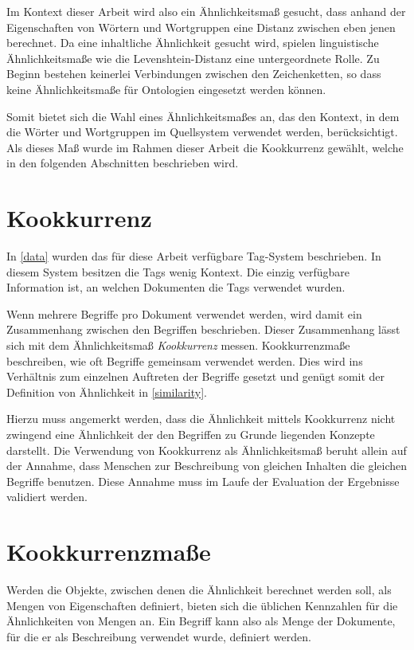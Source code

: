 Im Kontext dieser Arbeit wird also ein Ähnlichkeitsmaß gesucht, dass anhand der Eigenschaften von Wörtern und Wortgruppen eine Distanz zwischen eben jenen berechnet. Da eine inhaltliche Ähnlichkeit gesucht wird, spielen linguistische Ähnlichkeitsmaße wie die Levenshtein-Distanz eine untergeordnete Rolle. Zu Beginn bestehen keinerlei Verbindungen zwischen den Zeichenketten, so dass keine Ähnlichkeitsmaße für Ontologien eingesetzt werden können.

Somit bietet sich die Wahl eines Ähnlichkeitsmaßes an, das den Kontext, in dem die Wörter und Wortgruppen im Quellsystem verwendet werden, berücksichtigt. Als dieses Maß wurde im Rahmen dieser Arbeit die Kookkurrenz gewählt, welche in den folgenden Abschnitten beschrieben wird.

\section{Kookkurrenz}

In \ref{data} wurden das für diese Arbeit verfügbare Tag-System beschrieben. In diesem System besitzen die Tags wenig Kontext. Die einzig verfügbare Information ist, an welchen Dokumenten die Tags verwendet wurden.

Wenn mehrere Begriffe pro Dokument verwendet werden, wird damit ein Zusammenhang zwischen den Begriffen beschrieben. Dieser Zusammenhang lässt sich mit dem Ähnlichkeitsmaß \emph{Kookkurrenz} messen. Kookkurrenzmaße beschreiben, wie oft Begriffe gemeinsam verwendet werden. Dies wird ins Verhältnis zum einzelnen Auftreten der Begriffe gesetzt und genügt somit der Definition von Ähnlichkeit in \ref{similarity}.

Hierzu muss angemerkt werden, dass die Ähnlichkeit mittels Kookkurrenz nicht zwingend eine Ähnlichkeit der den Begriffen zu Grunde liegenden Konzepte darstellt. Die Verwendung von Kookkurrenz als Ähnlichkeitsmaß beruht allein auf der Annahme, dass Menschen zur Beschreibung von gleichen Inhalten die gleichen Begriffe benutzen. Diese Annahme muss im Laufe der Evaluation der Ergebnisse validiert werden.

\section{Kookkurrenzmaße}
\label{measures}

Werden die Objekte, zwischen denen die Ähnlichkeit berechnet werden soll, als Mengen von Eigenschaften definiert, bieten sich die üblichen Kennzahlen für die Ähnlichkeiten von Mengen an. Ein Begriff kann also als Menge der Dokumente, für die er als Beschreibung verwendet wurde, definiert werden.

